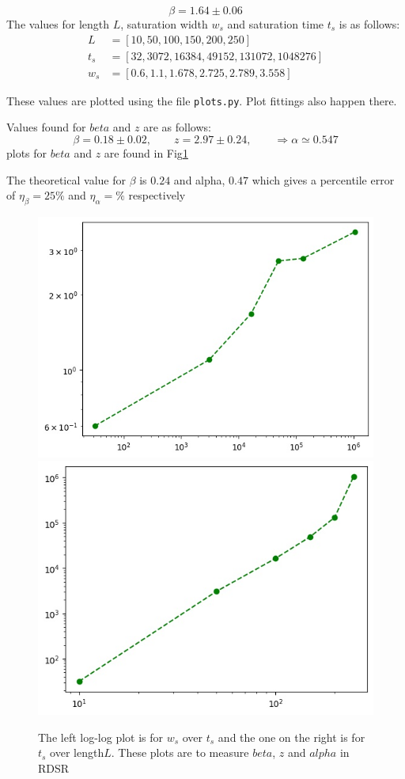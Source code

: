 \documentclass[12pt]{article}
\begin{document}
	\begin{equation*}
		\beta = 1.64 \pm 0.06
	\end{equation*}
	The values for length $L$, saturation width $w_s$ and saturation time $t_s$ is as follows:
	\begin{equation*}
		\begin{aligned}
			L		 &= [10, 50, 100, 150, 200, 250]\\
			t_s		&= [32, 3072, 16384, 49152, 131072, 1048276]\\
			w_s	  &= [0.6, 1.1, 1.678, 2.725, 2.789, 3.558] 
		\end{aligned}
	\end{equation*}
	
	These values are plotted using the file \texttt{plots.py}. Plot fittings also happen there.
	
	Values found for $beta$ and $z$ are as follows:
	\begin{equation*}
		\beta = 0.18 \pm 0.02, \qquad z = 2.97 \pm 0.24, \qquad \Rightarrow \alpha \simeq 0.547
	\end{equation*}
	plots for $beta$ and $z$ are found in Fig\ref{fig:beta_z}
	
	The theoretical value for $\beta$ is $0.24$ and alpha, $0.47$ which gives a percentile 
	error of $\eta_\beta = 25\%$ and $\eta_\alpha = \%$ respectively
	\begin{figure}[h!]
		\centering
		\includegraphics[width=.4\linewidth]{../P5/beta.jpg}
		\includegraphics[width=.4\linewidth]{../P5/z.jpg}
		\label{fig:beta_z}
		\caption{The left log-log plot is for $w_s$ over $t_s$ and the one on the right is for 
		$t_s$ over length$L$. These plots are to measure $beta$, $z$ and $alpha$ in RDSR}
	\end{figure}
	
\end{document}
